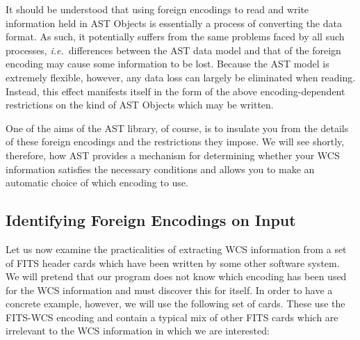 \documentclass[twoside,11pt]{article}
\begin{document}
It should be understood that using foreign encodings to read and write
information held in AST Objects is essentially a process of converting
the data format. As such, it potentially suffers from the same
problems faced by all such processes, {\em{i.e.}}\ differences between
the AST data model and that of the foreign encoding may cause some
information to be lost.  Because the AST model is extremely flexible,
however, any data loss can largely be eliminated when reading.
Instead, this effect manifests itself in the form of the above
encoding-dependent restrictions on the kind of AST Objects which may
be written.

One of the aims of the AST library, of course, is to insulate you from
the details of these foreign encodings and the restrictions they
impose. We will see shortly, therefore, how AST provides a mechanism
for determining whether your WCS information satisfies the necessary
conditions and allows you to make an automatic choice of which
encoding to use.

\subsection{\label{ss:identifyingfitsencoding}Identifying Foreign Encodings on Input}

Let us now examine the practicalities of extracting WCS information
from a set of FITS header cards which have been written by some other
software system. We will pretend that our program does not know which
encoding has been used for the WCS information and must discover this
for itself. In order to have a concrete example, however, we will use
the following set of cards. These use the FITS-WCS encoding and
contain a typical mix of other FITS cards which are irrelevant to the
WCS information in which we are interested:
\end{document}
